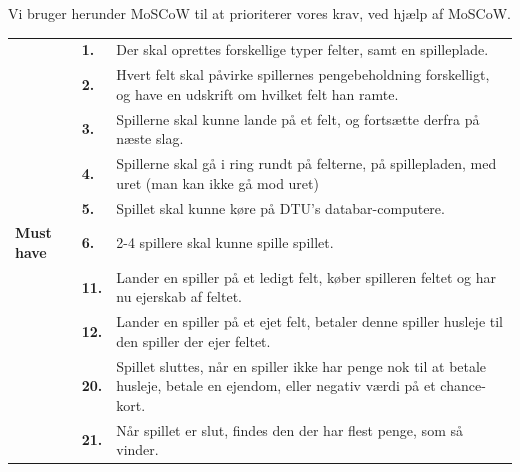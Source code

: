 \noindent Vi bruger herunder MoSCoW til at prioriterer vores krav, ved hjælp af MoSCoW.
\begin{center}
    \begin{tabular}{ || p{2.5cm} | p{.4cm} | p{12.4cm} ||}
        \hline
        \hline
    &        
    \textbf{1.}
    &
    Der skal oprettes forskellige typer felter, samt en spilleplade. 
    \\

    \cline{2-3}
    &
    \textbf{2.}
    & 
    Hvert felt skal påvirke spillernes pengebeholdning forskelligt, og have en udskrift om hvilket felt han ramte. 
    \\
    
    \cline{2-3}
    &
    \textbf{3.}
    &
    Spillerne skal kunne lande på et felt, og fortsætte derfra på næste slag.
    \\

    \cline{2-3}
    &
    \textbf{4.}
    &
    Spillerne skal gå i ring rundt på felterne, på spillepladen, med uret (man kan ikke gå mod uret)
    \\

    \cline{2-3}
    &
    \textbf{5.} 
    &
    Spillet skal kunne køre på DTU’s databar-computere.
    \\
    
    \cline{2-3}
    \textbf{Must have}
    &
    \textbf{6.}
    &
    2-4 spillere skal kunne spille spillet.
    \\
    
    \cline{2-3}
    &
    \textbf{11.}
    &
    Lander en spiller på et ledigt felt, køber spilleren feltet og 
    har nu ejerskab af feltet.
    \\

    \cline{2-3}
    &
    \textbf{12.}
    &
    Lander en spiller på et ejet felt, betaler denne spiller husleje til den spiller der ejer feltet.
    \\

    \cline{2-3}
    &
    \textbf{20.}
    &
    Spillet sluttes, når en spiller ikke har penge nok til at betale husleje, betale en ejendom, eller negativ værdi på et chance-kort.
    \\

    \cline{2-3}
    &
    \textbf{21.}
    &
    Når spillet er slut, findes den der har flest penge, som så vinder.
    \\
    \hline
    \hline
    \end{tabular}
    \end{center}
    
